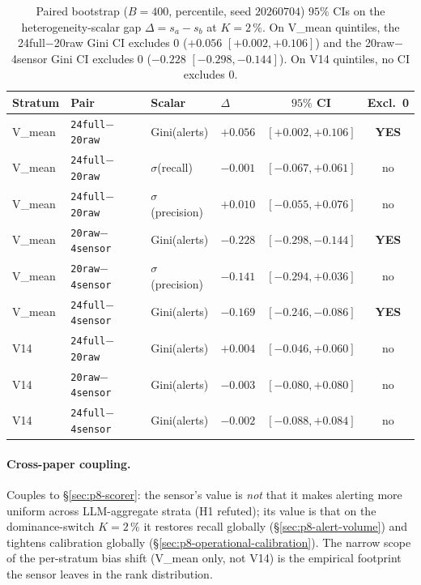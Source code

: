\begin{table}[t]
\centering
\small
\caption{Paired bootstrap ($B{=}400$, percentile, seed $20260704$)
$95\%$ CIs on the heterogeneity-scalar gap $\Delta = s_a - s_b$ at
$K{=}2\,\%$. On V\_mean quintiles, the 24full$-$20raw Gini CI excludes 0
($+0.056$ $[+0.002, +0.106]$) and the 20raw$-$4sensor Gini CI excludes 0
($-0.228$ $[-0.298, -0.144]$). On V14 quintiles, no CI excludes 0.}
\label{tab:p8-subgroup-fairness-boot}
\begin{tabular}{llllcc}
\toprule
Stratum & Pair & Scalar & $\Delta$ & $95\%$ CI & Excl.\ 0 \\
\midrule
V\_mean & \texttt{24full}$-$\texttt{20raw}    & Gini(alerts)        & $+0.056$  & $[+0.002, +0.106]$   & \textbf{YES} \\
V\_mean & \texttt{24full}$-$\texttt{20raw}    & $\sigma$(recall)    & $-0.001$  & $[-0.067, +0.061]$   & no \\
V\_mean & \texttt{24full}$-$\texttt{20raw}    & $\sigma$(precision) & $+0.010$  & $[-0.055, +0.076]$   & no \\
V\_mean & \texttt{20raw}$-$\texttt{4sensor}   & Gini(alerts)        & $-0.228$  & $[-0.298, -0.144]$   & \textbf{YES} \\
V\_mean & \texttt{20raw}$-$\texttt{4sensor}   & $\sigma$(precision) & $-0.141$  & $[-0.294, +0.036]$   & no \\
V\_mean & \texttt{24full}$-$\texttt{4sensor}  & Gini(alerts)        & $-0.169$  & $[-0.246, -0.086]$   & \textbf{YES} \\
V14     & \texttt{24full}$-$\texttt{20raw}    & Gini(alerts)        & $+0.004$  & $[-0.046, +0.060]$   & no \\
V14     & \texttt{20raw}$-$\texttt{4sensor}   & Gini(alerts)        & $-0.003$  & $[-0.080, +0.080]$   & no \\
V14     & \texttt{24full}$-$\texttt{4sensor}  & Gini(alerts)        & $-0.002$  & $[-0.088, +0.084]$   & no \\
\bottomrule
\end{tabular}
\end{table}

\paragraph{Cross-paper coupling.}
Couples to \S\ref{sec:p8-scorer}: the sensor's value is \emph{not}
that it makes alerting more uniform across LLM-aggregate strata (H1
refuted); its value is that on the dominance-switch $K{=}2\,\%$ it
restores recall globally (\S\ref{sec:p8-alert-volume}) and tightens
calibration globally (\S\ref{sec:p8-operational-calibration}). The
narrow scope of the per-stratum bias shift (V\_mean only, not V14) is
the empirical footprint the sensor leaves in the rank distribution.

